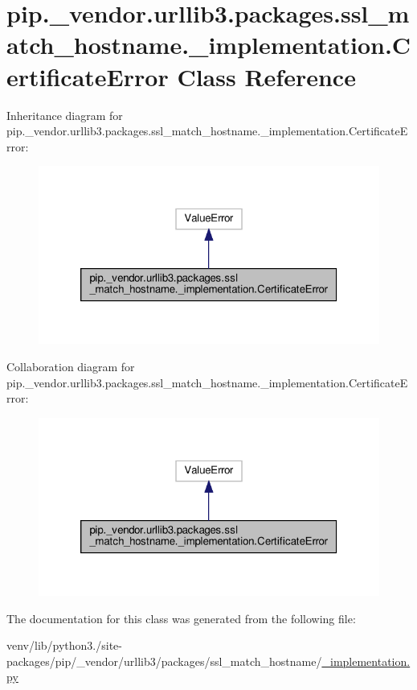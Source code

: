 \hypertarget{classpip_1_1__vendor_1_1urllib3_1_1packages_1_1ssl__match__hostname_1_1__implementation_1_1CertificateError}{}\section{pip.\+\_\+vendor.\+urllib3.\+packages.\+ssl\+\_\+match\+\_\+hostname.\+\_\+implementation.\+Certificate\+Error Class Reference}
\label{classpip_1_1__vendor_1_1urllib3_1_1packages_1_1ssl__match__hostname_1_1__implementation_1_1CertificateError}


Inheritance diagram for pip.\+\_\+vendor.\+urllib3.\+packages.\+ssl\+\_\+match\+\_\+hostname.\+\_\+implementation.\+Certificate\+Error\+:
\nopagebreak
\begin{figure}[H]
\begin{center}
\leavevmode
\includegraphics[width=320pt]{classpip_1_1__vendor_1_1urllib3_1_1packages_1_1ssl__match__hostname_1_1__implementation_1_1CertificateError__inherit__graph}
\end{center}
\end{figure}


Collaboration diagram for pip.\+\_\+vendor.\+urllib3.\+packages.\+ssl\+\_\+match\+\_\+hostname.\+\_\+implementation.\+Certificate\+Error\+:
\nopagebreak
\begin{figure}[H]
\begin{center}
\leavevmode
\includegraphics[width=320pt]{classpip_1_1__vendor_1_1urllib3_1_1packages_1_1ssl__match__hostname_1_1__implementation_1_1CertificateError__coll__graph}
\end{center}
\end{figure}


The documentation for this class was generated from the following file\+:\begin{DoxyCompactItemize}
\item 
venv/lib/python3./site-\/packages/pip/\+\_\+vendor/urllib3/packages/ssl\+\_\+match\+\_\+hostname/\hyperlink{__implementation_8py}{\+\_\+implementation.\+py}\end{DoxyCompactItemize}
